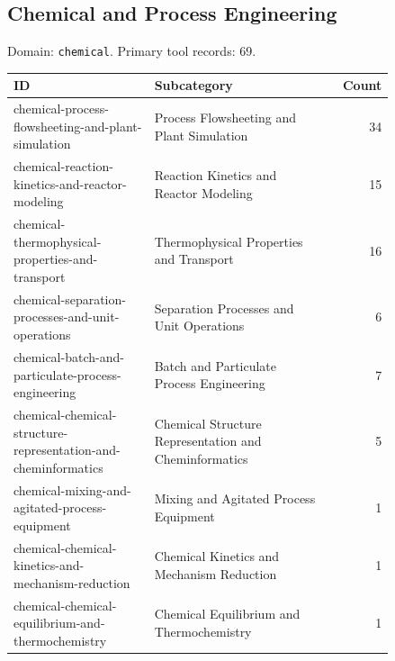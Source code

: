 \subsection{Chemical and Process Engineering}
\noindent Domain: \texttt{chemical}. Primary tool records: 69.
\begin{longtable}{p{0.37\linewidth}p{0.47\linewidth}r}
ID & Subcategory & Count\\\hline\endhead
chemical-process-flowsheeting-and-plant-simulation & Process Flowsheeting and Plant Simulation & 34\\
chemical-reaction-kinetics-and-reactor-modeling & Reaction Kinetics and Reactor Modeling & 15\\
chemical-thermophysical-properties-and-transport & Thermophysical Properties and Transport & 16\\
chemical-separation-processes-and-unit-operations & Separation Processes and Unit Operations & 6\\
chemical-batch-and-particulate-process-engineering & Batch and Particulate Process Engineering & 7\\
chemical-chemical-structure-representation-and-cheminformatics & Chemical Structure Representation and Cheminformatics & 5\\
chemical-mixing-and-agitated-process-equipment & Mixing and Agitated Process Equipment & 1\\
chemical-chemical-kinetics-and-mechanism-reduction & Chemical Kinetics and Mechanism Reduction & 1\\
chemical-chemical-equilibrium-and-thermochemistry & Chemical Equilibrium and Thermochemistry & 1\\
\end{longtable}
